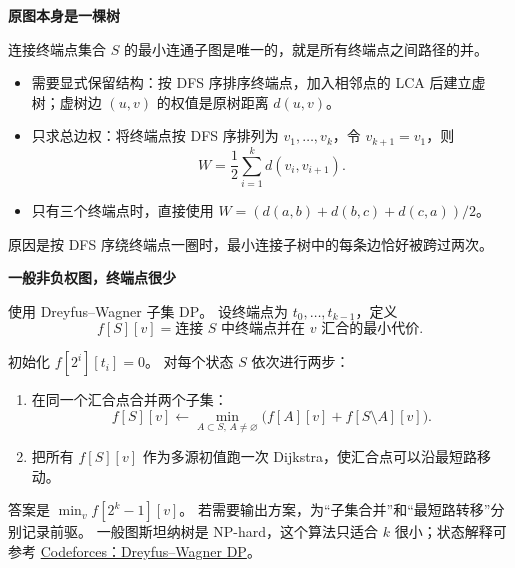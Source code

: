 \textbf{原图本身是一棵树}

连接终端点集合 $S$ 的最小连通子图是唯一的，就是所有终端点之间路径的并。

\begin{itemize}
  \item 需要显式保留结构：按 DFS 序排序终端点，加入相邻点的 LCA 后建立虚树；虚树边 $(u,v)$ 的权值是原树距离 $d(u,v)$。
  \item 只求总边权：将终端点按 DFS 序排列为 $v_1,\ldots,v_k$，令 $v_{k+1}=v_1$，则
  \[
    W=\frac12\sum_{i=1}^{k}d(v_i,v_{i+1}).
  \]
  \item 只有三个终端点时，直接使用
  $W=(d(a,b)+d(b,c)+d(c,a))/2$。
\end{itemize}

原因是按 DFS 序绕终端点一圈时，最小连接子树中的每条边恰好被跨过两次。

\textbf{一般非负权图，终端点很少}

使用 Dreyfus--Wagner 子集 DP。
设终端点为 $t_0,\ldots,t_{k-1}$，定义
\[
  f[S][v]=\text{连接 }S\text{ 中终端点并在 }v\text{ 汇合的最小代价}.
\]

初始化 $f[2^i][t_i]=0$。
对每个状态 $S$ 依次进行两步：

\begin{enumerate}
  \item 在同一个汇合点合并两个子集：
  \[
    f[S][v]\gets\min_{A\subset S,\,A\ne\varnothing}
    \bigl(f[A][v]+f[S\setminus A][v]\bigr).
  \]
  \item 把所有 $f[S][v]$ 作为多源初值跑一次 Dijkstra，使汇合点可以沿最短路移动。
\end{enumerate}

答案是 $\min_v f[2^k-1][v]$。
若需要输出方案，为“子集合并”和“最短路转移”分别记录前驱。
一般图斯坦纳树是 NP-hard，这个算法只适合 $k$ 很小；状态解释可参考
\href{https://codeforces.com/blog/entry/91601}{Codeforces：Dreyfus--Wagner DP}。
